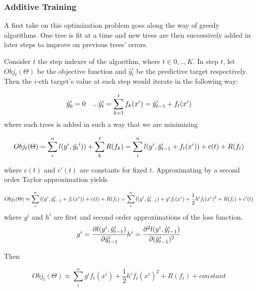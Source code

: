 \subsubsection{Additive Training}

A first take on this optimization problem goes along the way of greedy algorithms. One tree is fit at a time and new trees are then successively added in later steps to improve on previous trees' errors.

Consider $t$ the step indexer of the algorithm, where $t \in {0,..,K}$. In step $t$, let $Obj_t(\Theta)$ be the objective function and $\hat{y}_t^i$ be the predictive target respectively. Then the $i$-eth target's value at each step would iterate in the following way:

\begin{equation} \label{eq:gb-targetSteps}
\hat{y}_0^i = 0 \\
 \ \ \ ... \\ 
 \hat{y}_t^i = \sum_{k=1}^{t} f_k(x^i) = \hat{y}_{t-1}^i +  f_t(x^i)

\end{equation}
where each trees is added in such a way that we are minimizing

\[
Obj_t(\Theta) = \sum_i^n l(y^i,\hat{y_t}^i)) +   \sum_k^t R(f_k) \\
= \sum_i^n l(y^i,\hat{y}_{t-1}^i +  f_t(x^i) ) +   c(t) + R(f_t) \\
\]

where $c(t)$ and $c'(t)$ are constants for fixed $t$. Approximating by a second order Taylor approximation yields

\[
    Obj_t(\Theta) \approx \sum_i^n l(y^i, \hat{y}_{t-1}^i +  f_t(x^i) ) + c(t) + R(f_t) \\
    = \sum_i^n {l(y^i, \hat{y}_{t-1}^i) + g^i f_t(x^i) + \frac{1}{2} h^i f_t(x^i)^2 } +  R(f_t) +  c'(t)
\]
where $g^i$ and $h^i$ are first and second order approximations of the loss function.
\[
    g^i =  \frac{\partial l(y^i, \hat{y}_{t-1}^i)}{\partial \hat{y}_{t-1}^i} \\
    h^i =  \frac{\partial^2 l(y^i, \hat{y}_{t-1}^i)}{\partial (\hat{y}_{t-1}^i)^2 }
\]

Then

\begin{equation} \label{eq:gb-objFun1}
    Obj_t(\Theta) \approx \sum_i^n {  g^i f_t(x^i) + \frac{1}{2} h^i f_t(x^i)^2 } +  R(f_t) + constant 
\end{equation} 

